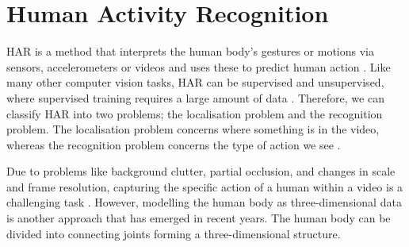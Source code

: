 \section{Human Activity Recognition}
\gls{HAR} is a method that interprets the human body's gestures or motions via sensors, accelerometers or videos and uses these to predict human action \autocite{jobanputra2019human}. Like many other computer vision tasks, \gls{HAR} can be supervised and unsupervised, where supervised training requires a large amount of data \autocite{ann2014human}. Therefore, we can classify \gls{HAR} into two problems; the localisation problem and the recognition problem. The localisation problem concerns where something is in the video, whereas the recognition problem concerns the type of action we see \autocite{vrigkas2015review}. 

Due to problems like background clutter, partial occlusion, and changes in scale and frame resolution, capturing the specific action of a human within a video is a challenging task \autocite{vrigkas2015review}. However, modelling the human body as three-dimensional data is another approach that has emerged in recent years. The human body can be divided into connecting joints forming a three-dimensional structure.  